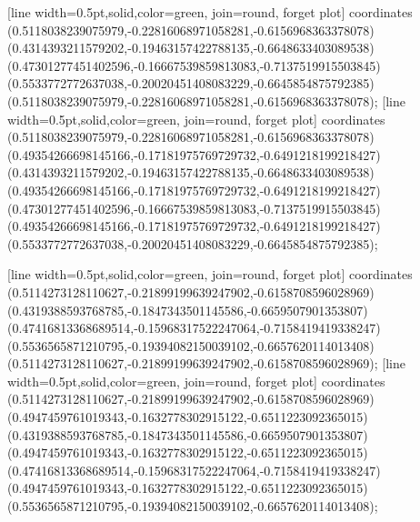 [line width=0.5pt,solid,color=green, join=round, forget plot] coordinates {(0.5118038239075979,-0.22816068971058281,-0.6156968363378078) (0.4314393211579202,-0.19463157422788135,-0.6648633403089538) (0.47301277451402596,-0.16667539859813083,-0.7137519915503845) (0.5533772772637038,-0.20020451408083229,-0.6645854875792385) (0.5118038239075979,-0.22816068971058281,-0.6156968363378078)};
[line width=0.5pt,solid,color=green, join=round, forget plot] coordinates {(0.5118038239075979,-0.22816068971058281,-0.6156968363378078) (0.49354266698145166,-0.17181975769729732,-0.6491218199218427) (0.4314393211579202,-0.19463157422788135,-0.6648633403089538) (0.49354266698145166,-0.17181975769729732,-0.6491218199218427) (0.47301277451402596,-0.16667539859813083,-0.7137519915503845) (0.49354266698145166,-0.17181975769729732,-0.6491218199218427) (0.5533772772637038,-0.20020451408083229,-0.6645854875792385)};

[line width=0.5pt,solid,color=green, join=round, forget plot] coordinates {(0.5114273128110627,-0.21899199639247902,-0.6158708596028969) (0.4319388593768785,-0.1847343501145586,-0.6659507901353807) (0.47416813368689514,-0.15968317522247064,-0.7158419419338247) (0.5536565871210795,-0.19394082150039102,-0.6657620114013408) (0.5114273128110627,-0.21899199639247902,-0.6158708596028969)};
[line width=0.5pt,solid,color=green, join=round, forget plot] coordinates {(0.5114273128110627,-0.21899199639247902,-0.6158708596028969) (0.4947459761019343,-0.1632778302915122,-0.6511223092365015) (0.4319388593768785,-0.1847343501145586,-0.6659507901353807) (0.4947459761019343,-0.1632778302915122,-0.6511223092365015) (0.47416813368689514,-0.15968317522247064,-0.7158419419338247) (0.4947459761019343,-0.1632778302915122,-0.6511223092365015) (0.5536565871210795,-0.19394082150039102,-0.6657620114013408)};


